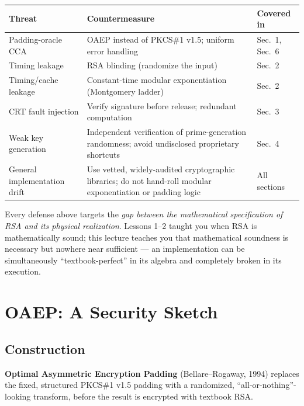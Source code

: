 \begin{center}
\begin{tabular}{p{4cm}p{6.5cm}p{3.5cm}}
\toprule
\textbf{Threat} & \textbf{Countermeasure} & \textbf{Covered in} \\
\midrule
Padding-oracle CCA & OAEP instead of PKCS\#1 v1.5; uniform error handling & Sec.~1, Sec.~6 \\
Timing leakage & RSA blinding (randomize the input) & Sec.~2 \\
Timing/cache leakage & Constant-time modular exponentiation (Montgomery ladder) & Sec.~2 \\
CRT fault injection & Verify signature before release; redundant computation & Sec.~3 \\
Weak key generation & Independent verification of prime-generation randomness; avoid undisclosed proprietary shortcuts & Sec.~4 \\
General implementation drift & Use vetted, widely-audited cryptographic libraries; do not hand-roll modular exponentiation or padding logic & All sections \\
\bottomrule
\end{tabular}
\end{center}

\begin{remark}
Every defense above targets the \emph{gap between the mathematical specification of RSA and its physical realization}. Lessons 1--2 taught you when RSA is mathematically sound; this lecture teaches you that mathematical soundness is necessary but nowhere near sufficient — an implementation can be simultaneously ``textbook-perfect'' in its algebra and completely broken in its execution.
\end{remark}

\newpage
\section{OAEP: A Security Sketch}\label{sec:oaep}

\subsection{Construction}

\textbf{Optimal Asymmetric Encryption Padding} (Bellare--Rogaway, 1994) replaces the fixed, structured PKCS\#1 v1.5 padding with a randomized, ``all-or-nothing''-looking transform, before the result is encrypted with textbook RSA.

